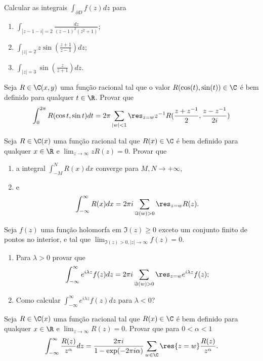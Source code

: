 \begin{problema}
Calcular as integrais $\int_{\partial D} f(z) dz$ para
\begin{enumerate}
\item $\int_{|z-1-i|=2} \frac{dz}{(z-1)^2 (z^2+1)}$;
\item $\int_{|z|=2} z \sin(\frac{z+1}{z-1}) dz$;
\item $\int_{|z|=3} \sin(\frac{z}{z+1}) dz$.
\end{enumerate}
\end{problema}


\begin{problema}
Seja $R \in \C(x,y)$ uma função racional tal que o valor $R(\cos(t),\sin(t))\in\C$ é bem definido
para qualquer $t\in\R$. Provar que
\[ \int_0^{2\pi} R(\cos t,\sin t) dt 
 = 2\pi \sum_{|w|<1} \res_{z=w} z^{-1} R(\frac{z+z^{-1}}{2},\frac{z-z^{-1}}{2i}) \]
\end{problema}

\begin{problema}
Seja $R \in \C(x)$ uma função racional tal que $R(x)\in\C$ é bem definido para qualquer $x\in\R$
e $\lim_{z\to\infty} zR(z) = 0$. Provar que
\begin{enumerate}
\item a integral $\int_{-M}^N R(x) dx$
converge para $M,N\to+\infty$,
\item  e \[ \int_{-\infty}^\infty R(x) dx = 2\pi i \sum_{\Im(w)>0} \res_{z=w} R(z). \]
\end{enumerate}
\end{problema}

\begin{problema}
Seja $f(z)$ uma função holomorfa em $\Im(z)\geq 0$ exceto um conjunto finito de pontos no interior,
e tal que $\lim_{\Im(z)>0, |z|\to\infty} f(z) = 0$.
\begin{enumerate}
\item Para $\lambda>0$ provar que
\[ \int_{-\infty}^\infty e^{i\lambda z} f(z) dz = 2\pi i \sum_{\Im(w)>0} \res_{z=w} e^{i\lambda z} f(z); \]
\item Como calcular $\int_{-\infty}^\infty e^{i\lambda z} f(z) dz$ para $\lambda<0$?
\end{enumerate}
\end{problema}

\begin{problema}
Seja $R \in \C(x)$ uma função racional tal que $R(x)\in\C$ é bem definido para qualquer $x\in\R$
e $\lim_{z\to\infty} R(z) = 0$. Provar que para $0<\alpha<1$
\[ \int_{-\infty}^\infty \frac{R(z)}{z^\alpha} dz 
 = \frac{2\pi i}{1-\exp(-2\pi i\alpha)} \sum_{w\in\C} \res{z=w} \frac{R(z)}{z^\alpha}. \]
\end{problema}

